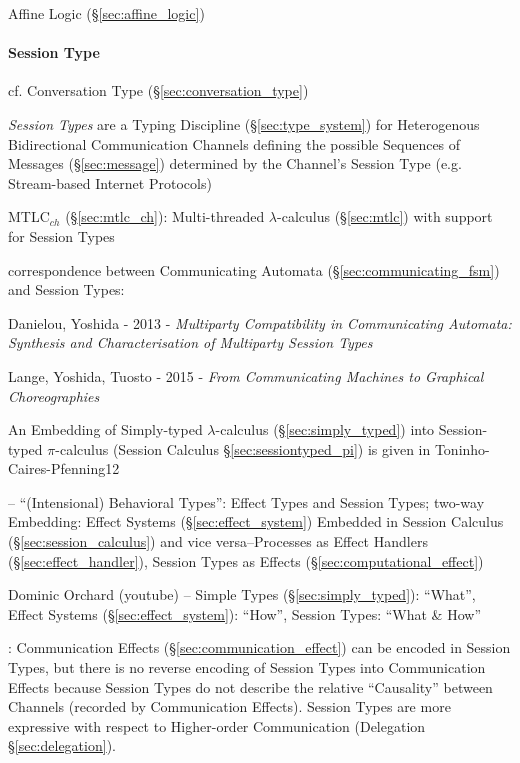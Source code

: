Affine Logic (\S\ref{sec:affine_logic})



\paragraph{Session Type}\label{sec:session_type}\hfill

\fist cf. Conversation Type (\S\ref{sec:conversation_type})

\emph{Session Types} are a Typing Discipline (\S\ref{sec:type_system})
for Heterogenous Bidirectional Communication Channels defining the
possible Sequences of Messages (\S\ref{sec:message}) determined by the
Channel's Session Type (e.g. Stream-based Internet Protocols)
\cite{neubauer-thiemann04}

\fist MTLC$_{ch}$ (\S\ref{sec:mtlc_ch}): Multi-threaded
$\lambda$-calculus (\S\ref{sec:mtlc}) with support for Session Types


\asterism


correspondence between Communicating Automata
(\S\ref{sec:communicating_fsm}) and Session Types:

Danielou, Yoshida - 2013 - \emph{Multiparty Compatibility in
  Communicating Automata: Synthesis and Characterisation of Multiparty
  Session Types}

Lange, Yoshida, Tuosto - 2015 -
\emph{From Communicating Machines to Graphical Choreographies}


\asterism


An Embedding of Simply-typed $\lambda$-calculus
(\S\ref{sec:simply_typed}) into Session-typed $\pi$-calculus (Session
Calculus \S\ref{sec:sessiontyped_pi}) is given in
Toninho-Caires-Pfenning12 \cite{caires-pfenning-toninho12}

\cite{orchard-yoshida16} -- ``(Intensional) Behavioral Types'': Effect
Types and Session Types; two-way Embedding: Effect Systems
(\S\ref{sec:effect_system}) Embedded in Session Calculus
(\S\ref{sec:session_calculus}) and vice versa--Processes as Effect
Handlers (\S\ref{sec:effect_handler}), Session Types as Effects
(\S\ref{sec:computational_effect})

Dominic Orchard (youtube) -- Simple Types (\S\ref{sec:simply_typed}):
``What'', Effect Systems (\S\ref{sec:effect_system}): ``How'', Session
Types: ``What \& How''

\cite{orchard-yoshida16}: Communication Effects
(\S\ref{sec:communication_effect}) can be encoded in Session Types,
but there is no reverse encoding of Session Types into Communication
Effects because Session Types do not describe the relative
``Causality'' between Channels (recorded by Communication Effects).
Session Types are more expressive with respect to Higher-order
Communication (Delegation \S\ref{sec:delegation}).

